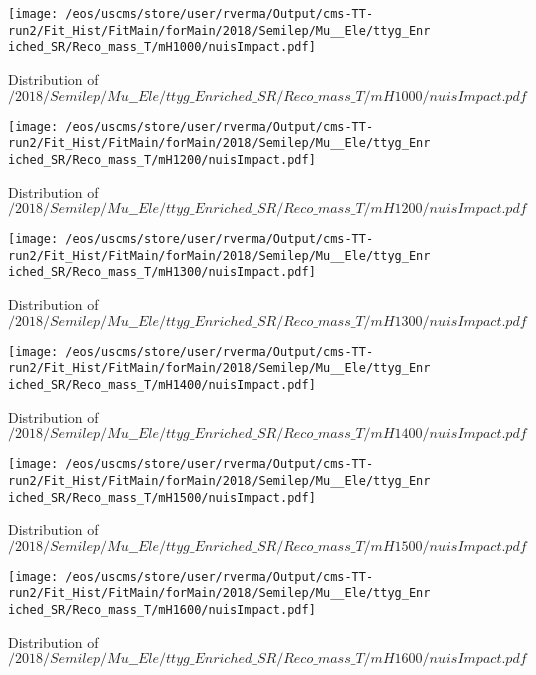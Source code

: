 \begin{figure}
\centering
\texttt{[image: /eos/uscms/store/user/rverma/Output/cms-TT-run2/Fit\_Hist/FitMain/forMain/2018/Semilep/Mu\_\_Ele/ttyg\_Enriched\_SR/Reco\_mass\_T/mH1000/nuisImpact.pdf]}
\caption{Distribution of $/2018/Semilep/Mu\_\_Ele/ttyg\_Enriched\_SR/Reco\_mass\_T/mH1000/nuisImpact.pdf$}
\end{figure}

\begin{figure}
\centering
\texttt{[image: /eos/uscms/store/user/rverma/Output/cms-TT-run2/Fit\_Hist/FitMain/forMain/2018/Semilep/Mu\_\_Ele/ttyg\_Enriched\_SR/Reco\_mass\_T/mH1200/nuisImpact.pdf]}
\caption{Distribution of $/2018/Semilep/Mu\_\_Ele/ttyg\_Enriched\_SR/Reco\_mass\_T/mH1200/nuisImpact.pdf$}
\end{figure}

\begin{figure}
\centering
\texttt{[image: /eos/uscms/store/user/rverma/Output/cms-TT-run2/Fit\_Hist/FitMain/forMain/2018/Semilep/Mu\_\_Ele/ttyg\_Enriched\_SR/Reco\_mass\_T/mH1300/nuisImpact.pdf]}
\caption{Distribution of $/2018/Semilep/Mu\_\_Ele/ttyg\_Enriched\_SR/Reco\_mass\_T/mH1300/nuisImpact.pdf$}
\end{figure}

\begin{figure}
\centering
\texttt{[image: /eos/uscms/store/user/rverma/Output/cms-TT-run2/Fit\_Hist/FitMain/forMain/2018/Semilep/Mu\_\_Ele/ttyg\_Enriched\_SR/Reco\_mass\_T/mH1400/nuisImpact.pdf]}
\caption{Distribution of $/2018/Semilep/Mu\_\_Ele/ttyg\_Enriched\_SR/Reco\_mass\_T/mH1400/nuisImpact.pdf$}
\end{figure}

\begin{figure}
\centering
\texttt{[image: /eos/uscms/store/user/rverma/Output/cms-TT-run2/Fit\_Hist/FitMain/forMain/2018/Semilep/Mu\_\_Ele/ttyg\_Enriched\_SR/Reco\_mass\_T/mH1500/nuisImpact.pdf]}
\caption{Distribution of $/2018/Semilep/Mu\_\_Ele/ttyg\_Enriched\_SR/Reco\_mass\_T/mH1500/nuisImpact.pdf$}
\end{figure}

\begin{figure}
\centering
\texttt{[image: /eos/uscms/store/user/rverma/Output/cms-TT-run2/Fit\_Hist/FitMain/forMain/2018/Semilep/Mu\_\_Ele/ttyg\_Enriched\_SR/Reco\_mass\_T/mH1600/nuisImpact.pdf]}
\caption{Distribution of $/2018/Semilep/Mu\_\_Ele/ttyg\_Enriched\_SR/Reco\_mass\_T/mH1600/nuisImpact.pdf$}
\end{figure}


